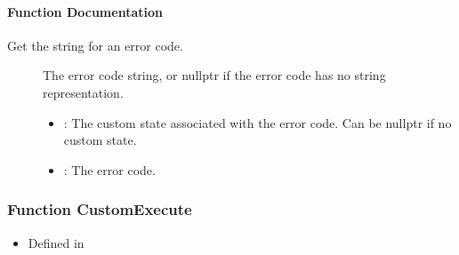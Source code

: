 \documentclass[letterpaper,10pt,english]{sphinxmanual}
\begin{document}
\paragraph{Function Documentation}
\label{\detokenize{cpp_api/function_custom_8h_1aedfdcb69f8eaab594173b197b10dc804:function-documentation}}

\begin{fulllineitems}
\label{\detokenize{cpp_api/function_custom_8h_1aedfdcb69f8eaab594173b197b10dc804:_CPPv417CustomErrorStringPvi}}%
\pysigstartmultiline
{}\label{\detokenize{cpp_api/function_custom_8h_1aedfdcb69f8eaab594173b197b10dc804:custom_8h_1aedfdcb69f8eaab594173b197b10dc804}}%
\pysigstopmultiline
Get the string for an error code. 

\begin{description}
\item[{}] \leavevmode
The error code string, or nullptr if the error code has no string representation. 

\item[{}] \leavevmode\begin{itemize}
\item {} 
: The custom state associated with the error code. Can be nullptr if no custom state. 

\item {} 
: The error code. 

\end{itemize}

\end{description}


\end{fulllineitems}



\subsubsection{Function CustomExecute}
\label{\detokenize{cpp_api/function_custom_8h_1afc75c0a4e1a169562586c2d4ff09ba40:function-customexecute}}\label{\detokenize{cpp_api/function_custom_8h_1afc75c0a4e1a169562586c2d4ff09ba40:exhale-function-custom-8h-1afc75c0a4e1a169562586c2d4ff09ba40}}\label{\detokenize{cpp_api/function_custom_8h_1afc75c0a4e1a169562586c2d4ff09ba40::doc}}\begin{itemize}
\item {} 
Defined in {\hyperref[\detokenize{cpp_api/file_src_servables_custom_custom.h:file-src-servables-custom-custom-h}]{}}

\end{itemize}
\end{document}
